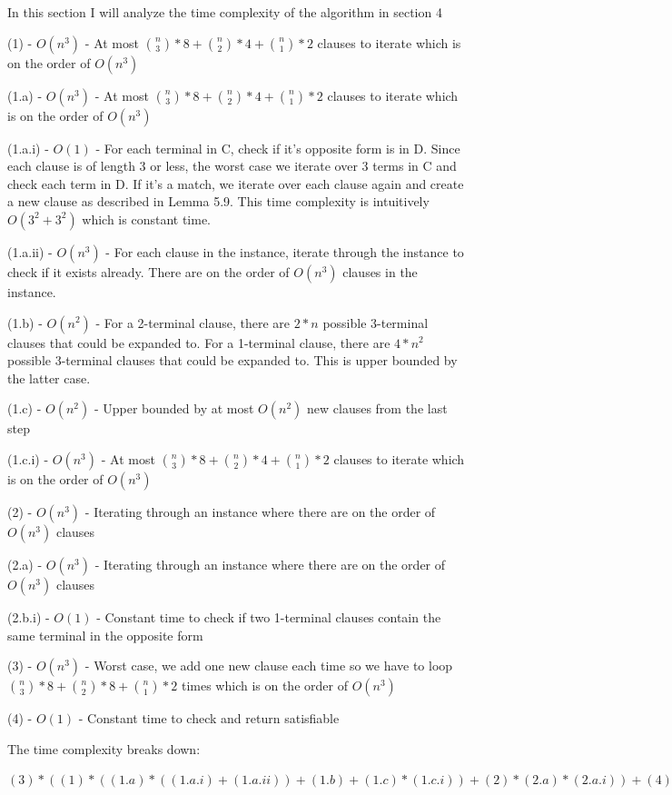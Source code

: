 \documentclass[manuscript]{acmart}
\begin{document}
    In this section I will analyze the time complexity of the algorithm in section 4

    (1) - $O(n^3)$ - At most ${\binom{n}{3}}*8 + {\binom{n}{2}}*4 + {\binom{n}{1}}*2$ clauses to iterate which is on the order of $O(n^3)$

    (1.a) - $O(n^3)$ -  At most ${\binom{n}{3}}*8 + {\binom{n}{2}}*4 + {\binom{n}{1}}*2$ clauses to iterate which is on the order of $O(n^3)$

    (1.a.i) - $O(1)$ - For each terminal in C, check if it's opposite form is in D. Since each clause is of length 3 or less, the worst case we iterate over 3 terms in C and check each term in D. If it's a match, we iterate over each clause again and create a new clause as described in Lemma 5.9. This time complexity is intuitively $O(3^2 + 3^2)$ which is constant time.

    (1.a.ii) - $O(n^3)$ - For each clause in the instance, iterate through the instance to check if it exists already. There are on the order of $O(n^3)$ clauses in the instance.

    (1.b) - $O(n^2)$ - For a 2-terminal clause, there are $2*n$ possible 3-terminal clauses that could be expanded to. For a 1-terminal clause, there are $4*n^2$ possible 3-terminal clauses that could be expanded to. This is upper bounded by the latter case.

    (1.c) - $O(n^2)$ - Upper bounded by at most $O(n^2)$ new clauses from the last step

    (1.c.i) - $O(n^3)$ - At most ${\binom{n}{3}}*8 + {\binom{n}{2}}*4 + {\binom{n}{1}}*2$ clauses to iterate which is on the order of $O(n^3)$

    (2) - $O(n^3)$ - Iterating through an instance where there are on the order of $O(n^3)$ clauses

    (2.a) - $O(n^3)$ - Iterating through an instance where there are on the order of $O(n^3)$ clauses

    (2.b.i) - $O(1)$ - Constant time to check if two 1-terminal clauses contain the same terminal in the opposite form

    (3) - $O(n^3)$ - Worst case, we add one new clause each time so we have to loop ${\binom{n}{3}} * 8 + {\binom{n}{2}} * 8 + {\binom{n}{1}} * 2$ times which is on the order of $O(n^3)$

    (4) - $O(1)$ - Constant time to check and return satisfiable

    The time complexity breaks down:

    $(3) * ((1) * ((1.a) * ((1.a.i) + (1.a.ii)) + (1.b) + (1.c) * (1.c.i)) + (2) * (2.a) * (2.a.i)) + (4)$
\end{document}
